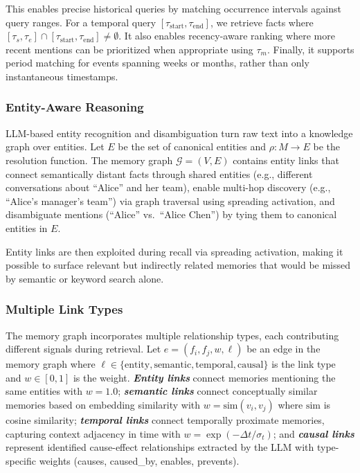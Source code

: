 This enables precise historical queries by matching occurrence intervals against query ranges. For a temporal query $[\tau_{\text{start}}, \tau_{\text{end}}]$, we retrieve facts where $[\tau_s, \tau_e] \cap [\tau_{\text{start}}, \tau_{\text{end}}] \neq \emptyset$. It also enables recency-aware ranking where more recent mentions can be prioritized when appropriate using $\tau_m$. Finally, it supports period matching for events spanning weeks or months, rather than only instantaneous timestamps.

\subsubsection{Entity-Aware Reasoning}

LLM-based entity recognition and disambiguation turn raw text into a knowledge graph over entities. Let $E$ be the set of canonical entities and $\rho: M \rightarrow E$ be the resolution function. The memory graph $\mathcal{G} = (V, E)$ contains entity links that connect semantically distant facts through shared entities (e.g., different conversations about ``Alice'' and her team), enable multi-hop discovery (e.g., ``Alice's manager's team'') via graph traversal using spreading activation, and disambiguate mentions (``Alice'' vs.\ ``Alice Chen'') by tying them to canonical entities in $E$.

Entity links are then exploited during recall via spreading activation, making it possible to surface relevant but indirectly related memories that would be missed by semantic or keyword search alone.

\subsubsection{Multiple Link Types}

The memory graph incorporates multiple relationship types, each contributing different signals during retrieval. Let $e = (f_i, f_j, w, \ell)$ be an edge in the memory graph where $\ell \in \{\text{entity}, \text{semantic}, \text{temporal}, \text{causal}\}$ is the link type and $w \in [0,1]$ is the weight. \textbf{\textit{Entity links}} connect memories mentioning the same entities with $w = 1.0$; \textbf{\textit{semantic links}} connect conceptually similar memories based on embedding similarity with $w = \text{sim}(v_i, v_j)$ where $\text{sim}$ is cosine similarity; \textbf{\textit{temporal links}} connect temporally proximate memories, capturing context adjacency in time with $w = \exp(-\Delta t / \sigma_t)$; and \textbf{\textit{causal links}} represent identified cause-effect relationships extracted by the LLM with type-specific weights (causes, caused\_by, enables, prevents).

